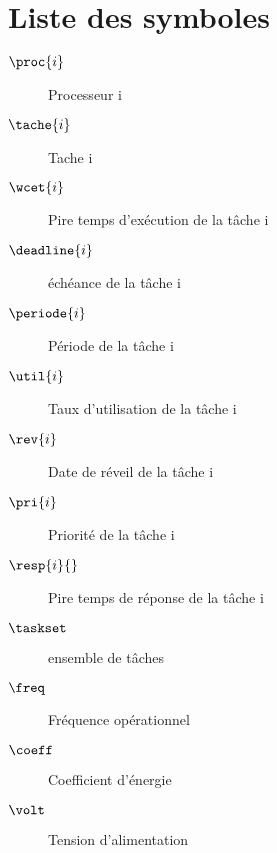 \section{Liste des symboles} 
\begin{description}
	\item[$\proc{i}$] Processeur i
	\item[$\tache{i}$] Tache i
	\item[$\wcet{i}$] Pire temps d'exécution de la tâche i
	\item[$\deadline{i}$] échéance de la tâche i
	\item[$\periode{i}$] Période de la tâche i
	\item[$\util{i}$] Taux d'utilisation de la tâche i
	\item[$\rev{i}$] Date de réveil de la tâche i
	\item[$\pri{i}$] Priorité de la tâche i
	\item[$\resp{i}{}$] Pire temps de réponse de la tâche i
	\item[$\taskset$] ensemble de tâches
	\item[$\freq$] Fréquence opérationnel 
	\item[$\coeff$] Coefficient d'énergie
	\item[$\volt$] Tension d’alimentation
\end{description}